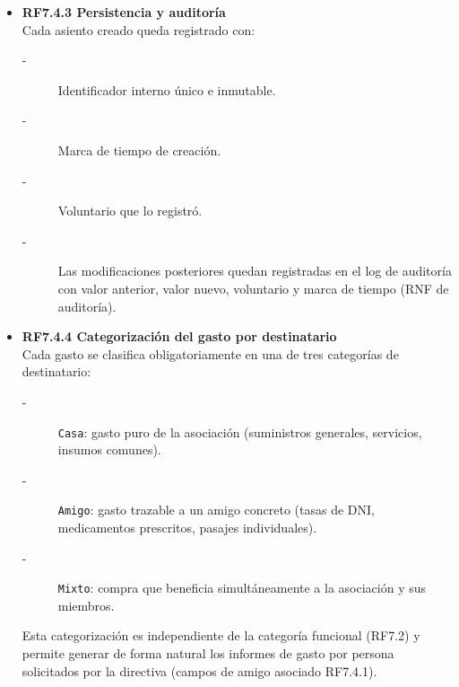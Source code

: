 \begin{itemize}
\begin{itemize}
\begin{description}
            \item[-] El importe es un número con dos decimales máximo.
            \item[-] Las cuentas y categorías referenciadas existen y están activas.
        \end{description}
        \item \textbf{RF7.4.3 Persistencia y auditoría} \\
        Cada asiento creado queda registrado con:
        \begin{description}
            \item[-] Identificador interno único e inmutable.
            \item[-] Marca de tiempo de creación.
            \item[-] Voluntario que lo registró.
            \item[-] Las modificaciones posteriores quedan registradas en el log de
            auditoría con valor anterior, valor nuevo, voluntario y marca de
            tiempo (RNF de auditoría).
        \end{description}
        \item \textbf{RF7.4.4 Categorización del gasto por destinatario} \\
        Cada gasto se clasifica obligatoriamente en una de tres categorías de destinatario:
        \begin{description}
            \item[-] \texttt{Casa}: gasto puro de la asociación (suministros generales, servicios, insumos comunes).
            \item[-] \texttt{Amigo}: gasto trazable a un amigo concreto (tasas de DNI, medicamentos prescritos, pasajes individuales).
            \item[-] \texttt{Mixto}: compra que beneficia simultáneamente a la asociación y sus miembros.
        \end{description}
        \par
        Esta categorización es independiente de la categoría funcional (RF7.2)
        y permite generar de forma natural los informes de gasto por persona
        solicitados por la directiva (campos de amigo asociado RF7.4.1).
    \end{itemize}


\end{itemize}
